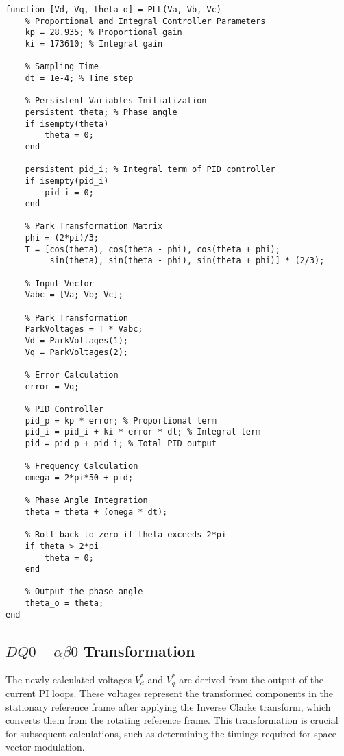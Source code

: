 \begin{lstlisting}[style=MATLAB, caption={Three-Phase Phase-Locked Loop}, label={lst:matlab}]
    function [Vd, Vq, theta_o] = PLL(Va, Vb, Vc)
    % Proportional and Integral Controller Parameters
    kp = 28.935; % Proportional gain
    ki = 173610; % Integral gain
    
    % Sampling Time
    dt = 1e-4; % Time step
    
    % Persistent Variables Initialization
    persistent theta; % Phase angle
    if isempty(theta)
        theta = 0;
    end
    
    persistent pid_i; % Integral term of PID controller
    if isempty(pid_i)
        pid_i = 0;
    end
    
    % Park Transformation Matrix
    phi = (2*pi)/3;
    T = [cos(theta), cos(theta - phi), cos(theta + phi);
         sin(theta), sin(theta - phi), sin(theta + phi)] * (2/3);
     
    % Input Vector
    Vabc = [Va; Vb; Vc];
    
    % Park Transformation
    ParkVoltages = T * Vabc;
    Vd = ParkVoltages(1);
    Vq = ParkVoltages(2);
    
    % Error Calculation
    error = Vq;
    
    % PID Controller
    pid_p = kp * error; % Proportional term
    pid_i = pid_i + ki * error * dt; % Integral term
    pid = pid_p + pid_i; % Total PID output
    
    % Frequency Calculation
    omega = 2*pi*50 + pid;
    
    % Phase Angle Integration
    theta = theta + (omega * dt);
    
    % Roll back to zero if theta exceeds 2*pi
    if theta > 2*pi
        theta = 0;
    end
    
    % Output the phase angle
    theta_o = theta;
end
\end{lstlisting}

\subsection{$DQ0-\alpha\beta0$ Transformation}
The newly calculated voltages \( V_d^* \) and \( V_q^* \) are derived from the
output of the current PI loops. These voltages represent the transformed
components in the stationary reference frame after applying the Inverse Clarke
transform, which converts them from the rotating reference frame. This
transformation is crucial for subsequent calculations, such as determining the
timings required for space vector modulation.\\

